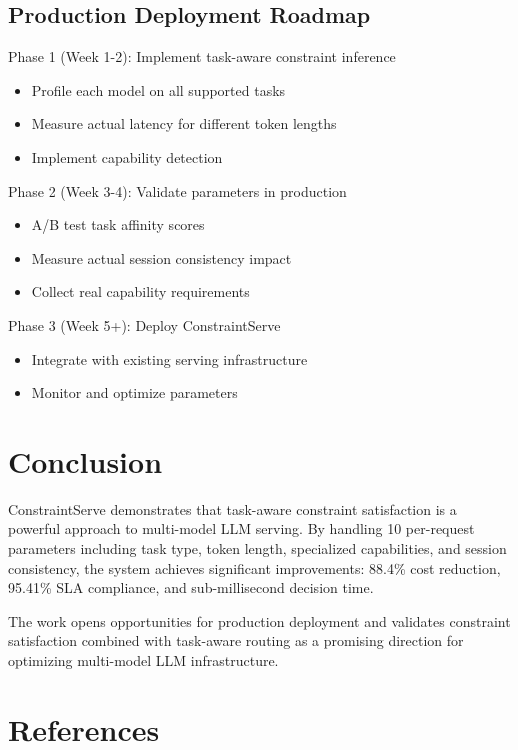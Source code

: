 \documentclass[11pt]{article}
\begin{document}
\subsection{Production Deployment Roadmap}

Phase 1 (Week 1-2): Implement task-aware constraint inference
\begin{itemize}
    \item Profile each model on all supported tasks
    \item Measure actual latency for different token lengths
    \item Implement capability detection
\end{itemize}

Phase 2 (Week 3-4): Validate parameters in production
\begin{itemize}
    \item A/B test task affinity scores
    \item Measure actual session consistency impact
    \item Collect real capability requirements
\end{itemize}

Phase 3 (Week 5+): Deploy ConstraintServe
\begin{itemize}
    \item Integrate with existing serving infrastructure
    \item Monitor and optimize parameters
\end{itemize}

\section{Conclusion}

ConstraintServe demonstrates that task-aware constraint satisfaction is a powerful approach to multi-model LLM serving. By handling 10 per-request parameters including task type, token length, specialized capabilities, and session consistency, the system achieves significant improvements: 88.4\% cost reduction, 95.41\% SLA compliance, and sub-millisecond decision time.

The work opens opportunities for production deployment and validates constraint satisfaction combined with task-aware routing as a promising direction for optimizing multi-model LLM infrastructure.

\section*{References}
\end{document}
